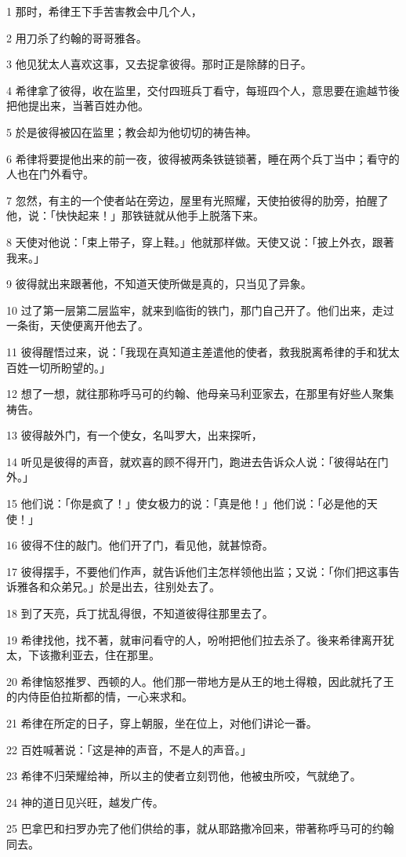 \par 1 那时，希律王下手苦害教会中几个人，
\par 2 用刀杀了约翰的哥哥雅各。
\par 3 他见犹太人喜欢这事，又去捉拿彼得。那时正是除酵的日子。
\par 4 希律拿了彼得，收在监里，交付四班兵丁看守，每班四个人，意思要在逾越节後把他提出来，当著百姓办他。
\par 5 於是彼得被囚在监里；教会却为他切切的祷告神。
\par 6 希律将要提他出来的前一夜，彼得被两条铁链锁著，睡在两个兵丁当中；看守的人也在门外看守。
\par 7 忽然，有主的一个使者站在旁边，屋里有光照耀，天使拍彼得的肋旁，拍醒了他，说：「快快起来！」那铁链就从他手上脱落下来。
\par 8 天使对他说：「束上带子，穿上鞋。」他就那样做。天使又说：「披上外衣，跟著我来。」
\par 9 彼得就出来跟著他，不知道天使所做是真的，只当见了异象。
\par 10 过了第一层第二层监牢，就来到临街的铁门，那门自己开了。他们出来，走过一条街，天使便离开他去了。
\par 11 彼得醒悟过来，说：「我现在真知道主差遣他的使者，救我脱离希律的手和犹太百姓一切所盼望的。」
\par 12 想了一想，就往那称呼马可的约翰、他母亲马利亚家去，在那里有好些人聚集祷告。
\par 13 彼得敲外门，有一个使女，名叫罗大，出来探听，
\par 14 听见是彼得的声音，就欢喜的顾不得开门，跑进去告诉众人说：「彼得站在门外。」
\par 15 他们说：「你是疯了！」使女极力的说：「真是他！」他们说：「必是他的天使！」
\par 16 彼得不住的敲门。他们开了门，看见他，就甚惊奇。
\par 17 彼得摆手，不要他们作声，就告诉他们主怎样领他出监；又说：「你们把这事告诉雅各和众弟兄。」於是出去，往别处去了。
\par 18 到了天亮，兵丁扰乱得很，不知道彼得往那里去了。
\par 19 希律找他，找不著，就审问看守的人，吩咐把他们拉去杀了。後来希律离开犹太，下该撒利亚去，住在那里。
\par 20 希律恼怒推罗、西顿的人。他们那一带地方是从王的地土得粮，因此就托了王的内侍臣伯拉斯都的情，一心来求和。
\par 21 希律在所定的日子，穿上朝服，坐在位上，对他们讲论一番。
\par 22 百姓喊著说：「这是神的声音，不是人的声音。」
\par 23 希律不归荣耀给神，所以主的使者立刻罚他，他被虫所咬，气就绝了。
\par 24 神的道日见兴旺，越发广传。
\par 25 巴拿巴和扫罗办完了他们供给的事，就从耶路撒冷回来，带著称呼马可的约翰同去。

